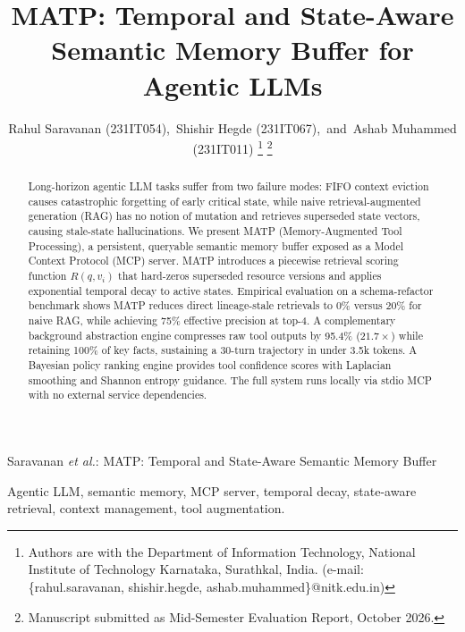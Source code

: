 \documentclass[lettersize,journal]{IEEEtran}
\begin{document}
\title{MATP: Temporal and State-Aware Semantic Memory Buffer for Agentic LLMs}

\author{Rahul Saravanan (231IT054),~Shishir Hegde (231IT067),~and~Ashab Muhammed (231IT011)%
\thanks{Authors are with the Department of Information Technology, National Institute of Technology Karnataka, Surathkal, India. (e-mail: \{rahul.saravanan, shishir.hegde, ashab.muhammed\}@nitk.edu.in)}%
\thanks{Manuscript submitted as Mid-Semester Evaluation Report, October 2026.}}

%
{Saravanan \MakeLowercase{\textit{et al.}}: MATP: Temporal and State-Aware Semantic Memory Buffer}

\maketitle

\begin{abstract}
Long-horizon agentic LLM tasks suffer from two failure modes: FIFO context eviction causes catastrophic forgetting of early critical state, while naive retrieval-augmented generation (RAG) has no notion of mutation and retrieves superseded state vectors, causing stale-state hallucinations. We present MATP (Memory-Augmented Tool Processing), a persistent, queryable semantic memory buffer exposed as a Model Context Protocol (MCP) server. MATP introduces a piecewise retrieval scoring function $R(q, v_i)$ that hard-zeros superseded resource versions and applies exponential temporal decay to active states. Empirical evaluation on a schema-refactor benchmark shows MATP reduces direct lineage-stale retrievals to 0\% versus 20\% for naive RAG, while achieving 75\% effective precision at top-4. A complementary background abstraction engine compresses raw tool outputs by 95.4\% ($21.7\times$) while retaining 100\% of key facts, sustaining a 30-turn trajectory in under 3.5k tokens. A Bayesian policy ranking engine provides tool confidence scores with Laplacian smoothing and Shannon entropy guidance. The full system runs locally via stdio MCP with no external service dependencies.
\end{abstract}

\begin{IEEEkeywords}
Agentic LLM, semantic memory, MCP server, temporal decay, state-aware retrieval, context management, tool augmentation.
\end{IEEEkeywords}

\end{document}
